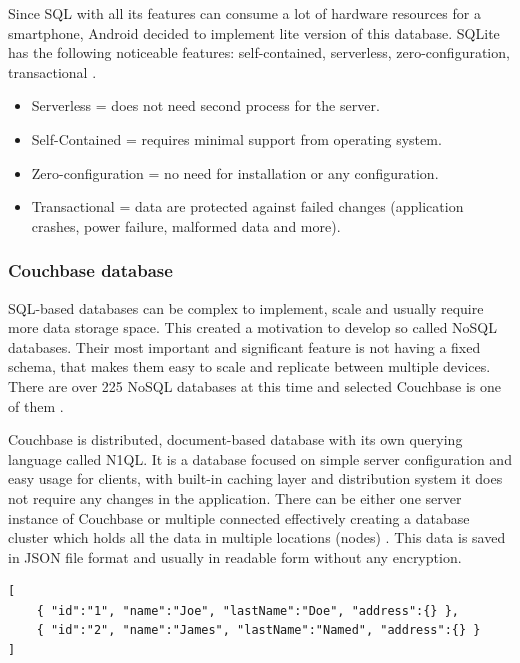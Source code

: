Since SQL with all its features can consume a lot of hardware resources for a smartphone, Android decided to implement lite version of this database. SQLite has the following noticeable features: self-contained, serverless, zero-configuration, transactional \cite{WISQLITE}.

\begin{itemize}
	\item Serverless = does not need second process for the server.
	\item Self-Contained = requires minimal support from operating system.
	\item Zero-configuration = no need for installation or any configuration.
	\item Transactional = data are protected against failed changes (application crashes, power failure, malformed data and more).
\end{itemize}

\subsubsection{Couchbase database}\label{subsec:CouchbaseDatabase}
SQL-based databases can be complex to implement, scale and usually require more data storage space. This created a motivation to develop so called NoSQL databases. Their most important and significant feature is not having a fixed schema, that makes them easy to scale and replicate between multiple devices. There are over 225 NoSQL databases at this time and selected Couchbase is one of them \cite{NOSQLDB}.

Couchbase is distributed, document-based database with its own querying language called N1QL. It is a database focused on simple server configuration and easy usage for clients, with built-in caching layer and distribution system it does not require any changes in the application. There can be either one server instance of Couchbase or multiple connected effectively creating a database cluster which holds all the data in multiple locations (nodes) \cite{GSWCBS}. This data is saved in JSON file format and usually in readable form without any encryption.

\begin{lstlisting}[caption=JSON format example]
[
	{ "id":"1", "name":"Joe", "lastName":"Doe", "address":{} },
	{ "id":"2", "name":"James", "lastName":"Named", "address":{} }
]
\end{lstlisting}

